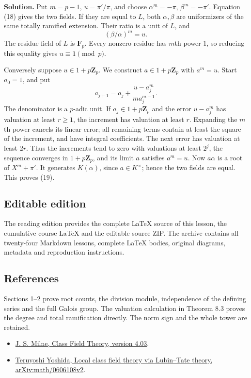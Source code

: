 \documentclass[11pt,a4paper]{article}
\newcommand{\tightlist}{\setlength{\itemsep}{0pt}\setlength{\parskip}{0pt}}
\begin{document}
\textbf{Solution.} Put \(m=p-1\), \(u=\pi'/\pi\), and choose
\(\alpha^m=-\pi\), \(\beta^m=-\pi'\). Equation (18) gives the two
fields. If they are equal to \(L\), both \(\alpha,\beta\) are
uniformizers of the same totally ramified extension. Their ratio is a
unit of \(L\), and \[
(\beta/\alpha)^m=u.
\] The residue field of \(L\) is \(\mathbf F_p\). Every nonzero residue
has \(m\)th power 1, so reducing this equality gives
\(u\equiv1\pmod p\).

Conversely suppose \(u\in1+p\mathbf Z_p\). We construct
\(a\in1+p\mathbf Z_p\) with \(a^m=u\). Start \(a_0=1\), and put \[
a_{j+1}=a_j+\frac{u-a_j^m}{m a_j^{m-1}}.
\] The denominator is a \(p\)-adic unit. If \(a_j\in1+p\mathbf Z_p\) and
the error \(u-a_j^m\) has valuation at least \(r\geq1\), the increment
has valuation at least \(r\). Expanding the \(m\)th power cancels its
linear error; all remaining terms contain at least the square of the
increment, and have integral coefficients. The next error has valuation
at least \(2r\). Thus the increments tend to zero with valuations at
least \(2^j\), the sequence converges in \(1+p\mathbf Z_p\), and its
limit \(a\) satisfies \(a^m=u\). Now \(a\alpha\) is a root of
\(X^m+\pi'\). It generates \(K(\alpha)\), since \(a\in K^\times\); hence
the two fields are equal. This proves (19).

\subsection{Editable edition}\label{editable-edition}

The reading edition provides the complete LaTeX source of this lesson,
the cumulative course LaTeX and the editable source ZIP. The archive
contains all twenty-four Markdown lessons, complete LaTeX bodies,
original diagrams, metadata and reproduction instructions.

\subsection{References}\label{references}

Sections 1--2 prove root counts, the division module, independence of
the defining series and the full Galois group. The valuation calculation
in Theorem 8.3 proves the degree and total ramification directly. The
norm sign and the whole tower are retained.

\begin{itemize}
\tightlist
\item
  \href{https://www.jmilne.org/math/CourseNotes/CFT.pdf}{J. S. Milne,
  Class Field Theory, version 4.03}.
\item
  \href{https://arxiv.org/abs/math/0606108v2}{Teruyoshi Yoshida, Local
  class field theory via Lubin--Tate theory, arXiv:math/0606108v2}.
\end{itemize}
\end{document}
